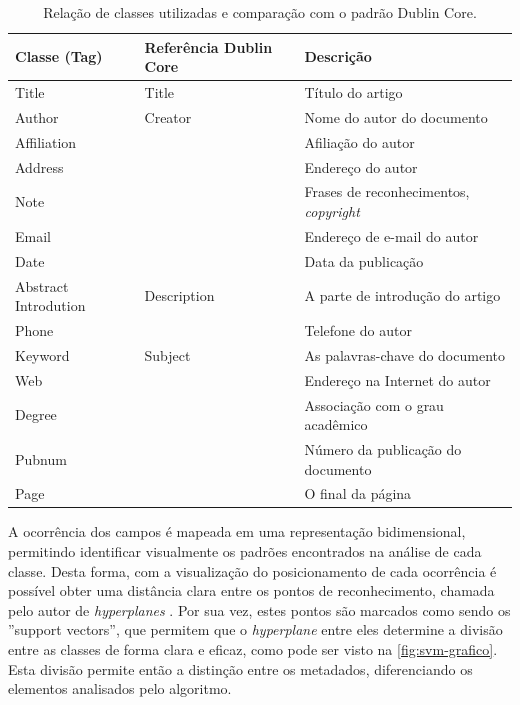 \begin{table}
    \caption{Relação de classes utilizadas e comparação com o padrão Dublin Core.}
    \begin{center}
        \begin{tabular}{|C{3cm}|C{3cm}|p{7cm}|}
            \hline \textbf{Classe (Tag)} & \textbf{Referência Dublin Core} & \textbf{Descrição}\\ 
            \hline Title & Title & Título do artigo\\
            \hline Author & Creator & Nome do autor do documento\\
            \hline Affiliation & & Afiliação do autor\\
            \hline Address & & Endereço do autor\\
            \hline Note & & Frases de reconhecimentos, \textit{copyright}\\
            \hline Email & & Endereço de e-mail do autor\\
            \hline Date & & Data da publicação\\
            \hline Abstract Introdution & Description & A parte de introdução do artigo\\
            \hline Phone & & Telefone do autor\\
            \hline Keyword & Subject & As palavras-chave do documento\\
            \hline Web & & Endereço na Internet do autor\\
            \hline Degree & & Associação com o grau acadêmico\\
            \hline Pubnum & & Número da publicação do documento\\
            \hline Page & & O final da página\\
            \hline
        \end{tabular}
    \end{center}
    \label{tab:svm-classes}
\end{table}

\begin{textonovo}
A ocorrência dos campos é mapeada em uma representação bidimensional, permitindo identificar visualmente os padrões encontrados na análise de cada classe. Desta forma, com a visualização do posicionamento de cada ocorrência é possível obter uma distância clara entre os pontos de reconhecimento, chamada pelo autor de \textit{hyperplanes} \cite{Vapnik-SVM}. Por sua vez, estes pontos são marcados como sendo os ''support vectors'', que permitem que o \textit{hyperplane} entre eles determine a divisão entre as classes de forma clara e eficaz, como pode ser visto na \autoref{fig:svm-grafico}. Esta divisão permite então a distinção entre os metadados, diferenciando os elementos analisados pelo algoritmo.
\end{textonovo}

